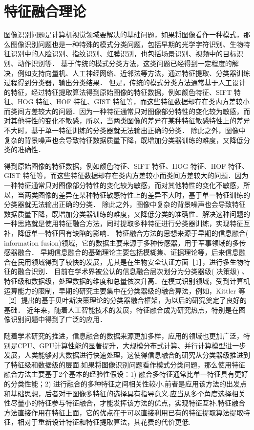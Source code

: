 \section{特征融合理论}
图像识别问题是计算机视觉领域要解决的基础问题，如果将图像看作一种模式，那么图像识别问题也是一种特殊的模式分类问题，包括早期的光学字符识别、生物特征识别中的人脸识别、指纹识别、虹膜识别，也包括场景识别、视频中的目标识别、动作识别等． 基于传统的模式分类方法，这类问题已经得到一定程度的解决，例如支持向量机、人工神经网络、近邻法等方法，通过特征提取、分类器训练过程得到分类器，输出分类结果． 但是，传统的模式分类方法通常基于人工设计的特征，经过特征提取算法得到原始图像的特征数据，例如颜色特征、SIFT 特征、HOG 特征、HOF 特征、GIST 特征等，而这些特征数据却存在类内方差较小而类间方差较大的问题．因为一种特征通常只对图像部分特性的变化较为敏感，而对其他特性的变化不敏感，所以，当两类图像的差异在某种特征敏感特性上的差异不大时，基于单一特征训练的分类器就无法输出正确的分类． 除此之外，图像中复杂的背景噪声也会导致特征数据质量下降，既增加分类器训练的难度，又降低分类的准确性．\par

得到原始图像的特征数据，例如颜色特征、SIFT 特征、HOG 特征、HOF 特征、GIST 特征等，而这些特征数据却存在类内方差较小而类间方差较大的问题．因为一种特征通常只对图像部分特性的变化较为敏感，而对其他特性的变化不敏感，所以，当两类图像的差异在某种特征敏感特性上的差异不大时，基于单一特征训练的分类器就无法输出正确的分类． 除此之外，图像中复杂的背景噪声也会导致特征数据质量下降，既增加分类器训练的难度，又降低分类的准确性．解决这种问题的一种思路就是使用特征融合方法，同时提取多种特征进行分类器训练，实现特征互补，降低单一特征固有缺陷的影响． 特征融合方法的思想来源于早期的信息融合( information fusion)领域，它的数据主要来源于多种传感器，用于军事领域的多传感器融合． 早期信息融合的基础理论主要包括模糊集、证据理论等，后来信息融合在民用领域得到了较快的发展，尤其是在生物安全认证方面［1］，进行多生物特征的融合识别． 目前在学术界被公认的信息融合层次划分为分类器级( 决策级) 、特征级和数据级，处理数据的维度和总量依次升高．在模式识别领域，受到计算机运算能力的限制，早期的研究主要集中在分类器级的融合算法，例如，Kittler
等［2］提出的基于贝叶斯决策理论的分类器融合框架，为以后的研究奠定了良好的基础． 近年来，随着人工智能技术的发展，特征融合成为研究热点，特别是在图像识别问题中得到了广泛的应用．

随着学术研究的推进，信息融合的数据来源更加多样，应用的领域也更加广泛，特别是CPU、GPU计算性能的显著提升，大规模分布式计算、并行计算模型进一步发展，人类能够对大数据进行快速处理，这使得信息融合的研究从分类器级推进到了特征级和数据级的层面.如果将图像识别问题看作模式分类问题，那么使用特征融合方法主要基于2个基本的经验性假设：1) 融合多特征通常比单一特征具有更好的分类性能；2) 进行融合的多种特征之间相关性较小.前者是应用该方法的出发点和基础思想，后者对于图像多特征的选择具有指导意义.应当从多个角度选择相关性尽量小的特征参与特征融合，才能发挥该方法的优点，实现特征互补.特征融合方法直接作用在特征上面，它的优点在于可以直接利用已有的特征提取算法提取特征，相对于重新设计特征和特征提取算法，其花费的代价更低.

